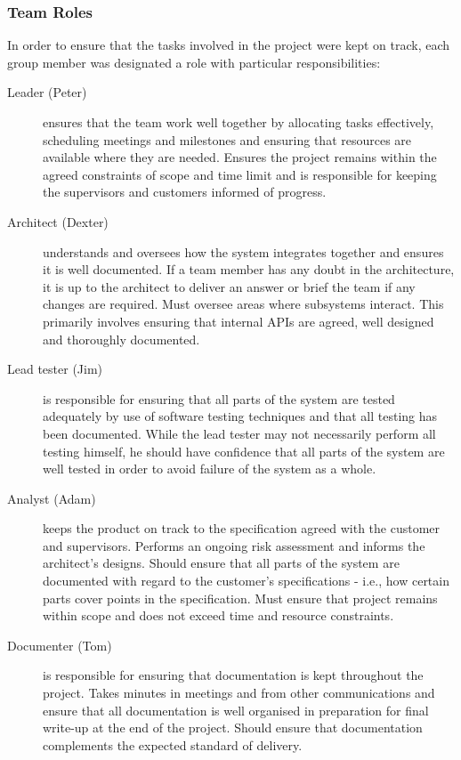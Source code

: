 \subsubsection{Team Roles}

In order to ensure that the tasks involved in the project were kept on track, each group member was designated a role with particular responsibilities:

\begin{description}
\item[Leader (Peter)] ensures that the team work well together by allocating tasks effectively, scheduling meetings and milestones and ensuring that resources are available where they are needed. Ensures the project remains within the agreed constraints of scope and time limit and is responsible for keeping the supervisors and customers informed of progress.
\item[Architect (Dexter)] understands and oversees how the system integrates together and ensures it is well documented. If a team member has any doubt in the architecture, it is up to the architect to deliver an answer or brief the team if any changes are required. Must oversee areas where subsystems interact. This primarily involves ensuring that internal APIs are agreed, well designed and thoroughly documented.
\item[Lead tester (Jim)] is responsible for ensuring that all parts of the system are tested adequately by use of software testing techniques and that all testing has been documented. While the lead tester may not necessarily perform all testing himself, he should have confidence that all parts of the system are well tested in order to avoid failure of the system as a whole.
\item[Analyst (Adam)] keeps the product on track to the specification agreed with the customer and supervisors. Performs an ongoing risk assessment and informs the architect's designs. Should ensure that all parts of the system are documented with regard to the customer's specifications - i.e., how certain parts cover points in the specification. Must ensure that project remains within scope and does not exceed time and resource constraints.
\item[Documenter (Tom)] is responsible for ensuring that documentation is kept throughout the project. Takes minutes in meetings and from other communications and ensure that all documentation is well organised in preparation for final write-up at the end of the project. Should ensure that documentation complements the expected standard of delivery.
\end{description}

